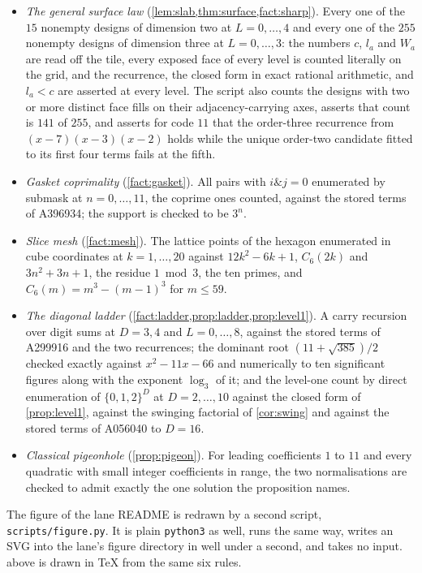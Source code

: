 \documentclass[11pt]{amsart}
\theoremstyle{definition}
\theoremstyle{remark}
\begin{document}
\begin{itemize}
\item \emph{The general surface law} (\cref{lem:slab,thm:surface,fact:sharp}). Every one of the $15$ nonempty designs of dimension two at $L = 0,\dots,4$ and every one of the $255$ nonempty designs of dimension three at $L = 0,\dots,3$: the numbers $c$, $l_{a}$ and $W_{a}$ are read off the tile, every exposed face of every level is counted literally on the grid, and the recurrence, the closed form in exact rational arithmetic, and $l_{a} < c$ are asserted at every level. The script also counts the designs with two or more distinct face fills on their adjacency-carrying axes, asserts that count is $141$ of $255$, and asserts for code $11$ that the order-three recurrence from $(x-7)(x-3)(x-2)$ holds while the unique order-two candidate fitted to its first four terms fails at the fifth.
\item \emph{Gasket coprimality} (\cref{fact:gasket}). All pairs with $i \mathbin{\&} j = 0$ enumerated by submask at $n = 0,\dots,11$, the coprime ones counted, against the stored terms of A396934; the support is checked to be $3^{n}$.
\item \emph{Slice mesh} (\cref{fact:mesh}). The lattice points of the hexagon enumerated in cube coordinates at $k = 1,\dots,20$ against $12k^{2}-6k+1$, $C_{6}(2k)$ and $3n^{2}+3n+1$, the residue $1 \bmod 3$, the ten primes, and $C_{6}(m) = m^{3}-(m-1)^{3}$ for $m \le 59$.
\item \emph{The diagonal ladder} (\cref{fact:ladder,prop:ladder,prop:level1}). A carry recursion over digit sums at $D = 3, 4$ and $L = 0,\dots,8$, against the stored terms of A299916 and the two recurrences; the dominant root $(11+\sqrt{385})/2$ checked exactly against $x^{2}-11x-66$ and numerically to ten significant figures along with the exponent $\log_{3}$ of it; and the level-one count by direct enumeration of $\{0,1,2\}^{D}$ at $D = 2,\dots,10$ against the closed form of \cref{prop:level1}, against the swinging factorial of \cref{cor:swing} and against the stored terms of A056040 to $D = 16$.
\item \emph{Classical pigeonhole} (\cref{prop:pigeon}). For leading coefficients $1$ to $11$ and every quadratic with small integer coefficients in range, the two normalisations are checked to admit exactly the one solution the proposition names.
\end{itemize}

The figure of the lane README is redrawn by a second script, \texttt{scripts/\allowbreak figure.py}. It is plain \texttt{python3} as well, runs the same way, writes an SVG into the lane's figure directory in well under a second, and takes no input.  above is drawn in \TeX{} from the same six rules.
\end{document}
